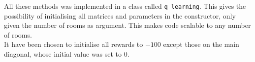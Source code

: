 \documentclass[../Head/Main.tex]{subfiles}
\begin{document}
All these methods was implemented in a class called \texttt{q\_learning}. This gives the possibility of initialising all matrices and parameters in the constructor, only given the number of rooms as argument. This makes code scalable to any number of rooms.\\
It have been chosen to initialise all rewards to $-100$ except those on the main diagonal, whose initial value was set to $0$.\\
\end{document}
